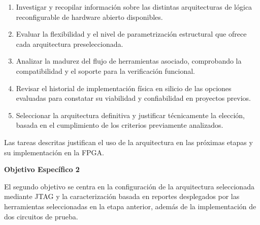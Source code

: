 \begin{enumerate}

    \item Investigar y recopilar información sobre las distintas 
    arquitecturas de lógica reconfigurable de hardware abierto 
    disponibles.
     
    \item Evaluar la flexibilidad y el nivel de parametrización 
    estructural que ofrece cada arquitectura preseleccionada.
    
    \item Analizar la madurez del flujo de herramientas asociado, 
    comprobando la compatibilidad y el soporte para la verificación 
    funcional.

    \item Revisar el historial de implementación física en silicio 
    de las opciones evaluadas para constatar su viabilidad y 
    confiabilidad en proyectos previos. 

    \item Seleccionar la arquitectura definitiva y justificar técnicamente 
    la elección, basada en el cumplimiento de los criterios previamente 
    analizados.

\end{enumerate}

Las tareas descritas justifican el uso de la arquitectura en las próximas 
etapas y su implementación en la FPGA.

\textbf{\normalsize{Objetivo Específico 2}}

El segundo objetivo se centra en la configuración de la arquitectura 
seleccionada mediante JTAG y la caracterización basada en reportes 
desplegados por las herramientas seleccionadas en la etapa anterior, 
además de la implementación de dos circuitos de prueba.

